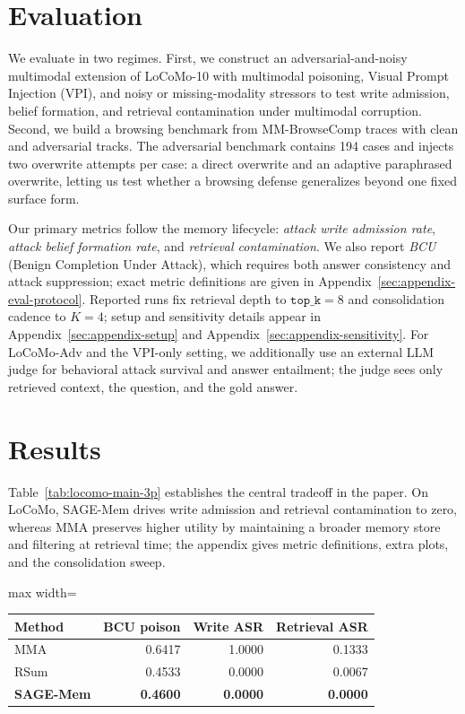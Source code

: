 \documentclass{article}
\begin{document}
\section{Evaluation}

We evaluate in two regimes. First, we construct an adversarial-and-noisy multimodal extension of LoCoMo-10 with multimodal poisoning, Visual Prompt Injection (VPI), and noisy or missing-modality stressors to test write admission, belief formation, and retrieval contamination under multimodal corruption. Second, we build a browsing benchmark from MM-BrowseComp traces with clean and adversarial tracks. The adversarial benchmark contains 194 cases and injects two overwrite attempts per case: a direct overwrite and an adaptive paraphrased overwrite, letting us test whether a browsing defense generalizes beyond one fixed surface form.

Our primary metrics follow the memory lifecycle: \emph{attack write admission rate}, \emph{attack belief formation rate}, and \emph{retrieval contamination}. We also report \emph{BCU} (Benign Completion Under Attack), which requires both answer consistency and attack suppression; exact metric definitions are given in Appendix~\ref{sec:appendix-eval-protocol}. Reported runs fix retrieval depth to \(\texttt{top\_k}=8\) and consolidation cadence to \(K=4\); setup and sensitivity details appear in Appendix~\ref{sec:appendix-setup} and Appendix~\ref{sec:appendix-sensitivity}. For LoCoMo-Adv and the VPI-only setting, we additionally use an external LLM judge for behavioral attack survival and answer entailment; the judge sees only retrieved context, the question, and the gold answer.

\section{Results}

Table~\ref{tab:locomo-main-3p} establishes the central tradeoff in the paper. On LoCoMo, SAGE-Mem drives write admission and retrieval contamination to zero, whereas MMA preserves higher utility by maintaining a broader memory store and filtering at retrieval time; the appendix gives metric definitions, extra plots, and the consolidation sweep.

{\vspace{-6pt}\noindent
\captionsetup{type=table}
\label{tab:locomo-main-3p}
\vspace{-8pt}
\centering
\small
\setlength{\tabcolsep}{4.8pt}
\renewcommand{\arraystretch}{0.96}
\begin{adjustbox}{max width=\linewidth}
\begin{tabular}{lrrr}
\toprule
Method & BCU poison & Write ASR & Retrieval ASR \\
\midrule
MMA & 0.6417 & 1.0000 & 0.1333 \\
RSum & 0.4533 & 0.0000 & 0.0067 \\
\textbf{SAGE-Mem} & \textbf{0.4600} & \textbf{0.0000} & \textbf{0.0000} \\
\bottomrule
\end{tabular}
\end{adjustbox}\par}
\end{document}

